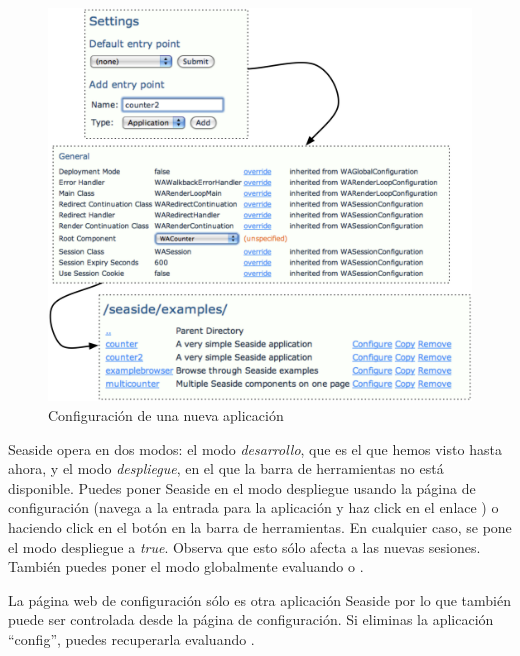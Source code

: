 \documentclass[a4paper,10pt,twoside]{book}
\begin{document}
\begin{figure}[ht]
\begin{center}
\includegraphics[width=\textwidth]{counter2}
\caption{Configuración de una nueva aplicación}
\end{center}
\end{figure}

Seaside opera en dos modos: el modo \emph{desarrollo}, que es el que hemos visto hasta ahora, y el modo \emph{despliegue}, en el que la barra de herramientas no está disponible.
Puedes poner Seaside en el modo despliegue usando la página de configuración (navega a la entrada para la aplicación y haz click en el enlace )
o haciendo click en el botón  en la barra de herramientas.
En cualquier caso, se pone el modo despliegue a \emph{true}.
Observa que esto sólo afecta a las nuevas sesiones.
También puedes poner el modo globalmente evaluando
 
o
.

La página web de configuración sólo es otra aplicación Seaside por lo que también puede ser controlada desde la página de configuración.
Si eliminas la aplicación ``config'', puedes recuperarla evaluando
 .
\end{document}
